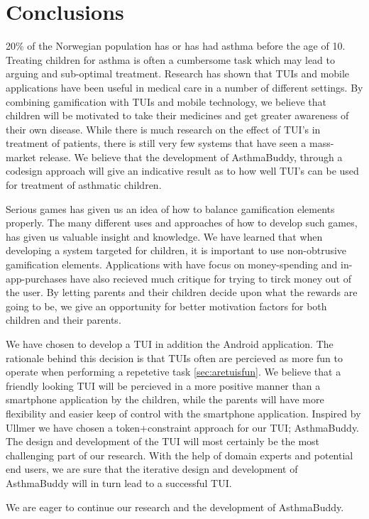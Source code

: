 \chapter{Conclusions}
\label{conclusions}

20\% of the Norwegian population has or has had asthma before the age of 10. Treating children for asthma is often a cumbersome task which may lead to arguing and sub-optimal treatment. Research has shown that TUIs and mobile applications have been useful in medical care in a number of different settings. By combining gamification with TUIs and mobile technology, we believe that children will be motivated to take their medicines and get greater awareness of their own disease. While there is much research on the effect of TUI's in treatment of patients, there is still very few systems that have seen a mass-market release. We believe that the development of AsthmaBuddy, through a codesign approach will give an indicative result as to how well TUI's can be used for treatment of asthmatic children.


Serious games has given us an idea of how to balance gamification elements properly. The many different uses and approaches of how to develop such games, has given us valuable insight and knowledge. We have learned that when developing a system targeted for children, it is important to use non-obtrusive gamification elements. Applications with have focus on money-spending and in-app-purchases have also recieved much critique for trying to tirck money out of the user. By letting parents and their children decide upon what the rewards are going to be, we give an opportunity for better motivation factors for both children and their parents. 


We have chosen to develop a TUI in addition the Android application. The rationale behind this decision is that TUIs often are percieved as more fun to operate when performing a repetetive task \ref{sec:aretuisfun}. We believe that a friendly looking TUI will be percieved in a more positive manner than a smartphone application by the children, while the parents will have more flexibility and easier keep of control with the smartphone application. Inspired by Ullmer \cite{ullmer2002tangible} we have chosen a token+constraint approach for our TUI; AsthmaBuddy. The design and development of the TUI will most certainly be the most challenging part of our research. With the help of domain experts and potential end users, we are sure that the iterative design and development of AsthmaBuddy will in turn lead to a successful TUI. 

We are eager to continue our research and the development of AsthmaBuddy. 


